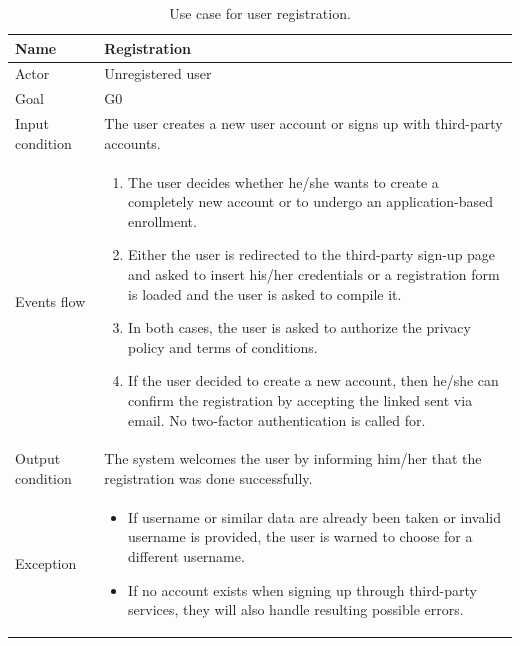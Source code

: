 \begin{table}
\centering
\begin{tabular}{| l | p{} |}
\hline
Name & Registration \\ \hline
Actor & Unregistered user \\ \hline
Goal & G0 \\ \hline
Input condition & The user creates a new user account or signs up with third-party accounts. \\ \hline
Events flow & \begin{enumerate}
	\item The user decides whether he/she wants to create a completely new account or to undergo an application-based enrollment.
	\item Either the user is redirected to the third-party sign-up page and asked to insert his/her credentials or a registration form is loaded and the user is asked to compile it.\label{load-registration}
	\item In both cases, the user is asked to authorize the privacy policy and terms of conditions.
	\item If the user decided to create a new account, then he/she can confirm the registration by accepting the linked sent via email. No two-factor authentication is called for.
	\end{enumerate}
\\
\hline
Output condition & The system welcomes the user by informing him/her that the registration was done successfully. \\
\hline

Exception &  \begin{itemize}
	\item If username or similar data are already been taken or invalid username is provided, the user is warned to choose for a different username.
   	\item If no account exists when signing up through third-party services, they will also handle resulting possible errors.
	\end{itemize}
 \\ \hline
\end{tabular}
\caption{Use case for user registration.}
\label{usecase-registration}
\end{table}

